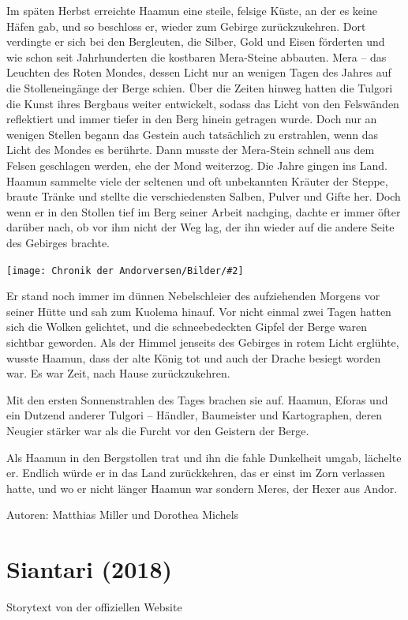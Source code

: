 \documentclass[10pt, a4paper, oneside]{book}
\newcommand{\fillbreak}{\vspace*{\fill}\columnbreak}
\newcommand{\storytext}[1]{%
    \section{#1}%
    \label{Storytext: #1}%
}
\newcommand{\bildmitts}[2][height=0.32\textwidth,width=0.48\textwidth,keepaspectratio]{%
    \begin{center}
        \texttt{[image: Chronik der Andorversen/Bilder/\#2]}
    \end{center}
}
\begin{document}
\begin{multicols}{2}
Im späten Herbst erreichte Haamun eine steile, felsige Küste, an der es keine Häfen gab, und so beschloss er, wieder zum Gebirge zurückzukehren. Dort verdingte er sich bei den Bergleuten, die Silber, Gold und Eisen förderten und wie schon seit Jahrhunderten die kostbaren Mera-Steine abbauten. Mera – das Leuchten des Roten Mondes, dessen Licht nur an wenigen Tagen des Jahres auf die Stolleneingänge der Berge schien. Über die Zeiten hinweg hatten die Tulgori die Kunst ihres Bergbaus weiter entwickelt, sodass das Licht von den Felswänden reflektiert und immer tiefer in den Berg hinein getragen wurde. Doch nur an wenigen Stellen begann das Gestein auch tatsächlich zu erstrahlen, wenn das Licht des Mondes es berührte. Dann musste der Mera-Stein schnell aus dem Felsen geschlagen werden, ehe der Mond weiterzog. Die Jahre gingen ins Land. Haamun sammelte viele der seltenen und oft unbekannten Kräuter der Steppe, braute Tränke und stellte die verschiedensten Salben, Pulver und Gifte her. Doch wenn er in den Stollen tief im Berg seiner Arbeit nachging, dachte er immer öfter darüber nach, ob vor ihm nicht der Weg lag, der ihn wieder auf die andere Seite des Gebirges brachte.\bigskip

\bildmitts{Tulgor Bild 1.jpg}

Er stand noch immer im dünnen Nebelschleier des aufziehenden Morgens vor seiner Hütte und sah zum Kuolema hinauf. Vor nicht einmal zwei Tagen hatten sich die Wolken gelichtet, und die schneebedeckten Gipfel der Berge waren sichtbar geworden. Als der Himmel jenseits des Gebirges in rotem Licht erglühte, wusste Haamun, dass der alte König tot und auch der Drache besiegt worden war. Es war Zeit, nach Hause zurückzukehren.

Mit den ersten Sonnenstrahlen des Tages brachen sie auf. Haamun, Eforas und ein Dutzend anderer Tulgori – Händler, Baumeister und Kartographen, deren Neugier stärker war als die Furcht vor den Geistern der Berge.

Als Haamun in den Bergstollen trat und ihn die fahle Dunkelheit umgab, lächelte er. Endlich würde er in das Land zurückkehren, das er einst im Zorn verlassen hatte, und wo er nicht länger Haamun war sondern Meres, der Hexer aus Andor.\bigskip

Autoren: Matthias Miller und Dorothea Michels





\fillbreak
\storytext{Siantari (2018)}

\begin{center}
    Storytext von der offiziellen Website
\end{center}


\end{multicols}
\end{document}
